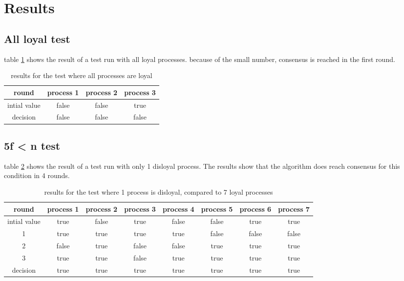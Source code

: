 \section{Results}

\subsection{All loyal test}
table \ref{table:resultsAllLoyal} shows the result of a test run with all loyal processes. because of the small number, consensus is reached in the first round.


\begin{table}[h]
	\begin{tabular}{ | c | c  | c  | c| }
		\hline
  		round & process 1 & process 2 & process 3 \\
		\hline
 		intial value &  false & false & true  \\
		\hline
  		decision  & false & false & false  \\
		\hline
	\end{tabular}
	\caption{results for the test where all processes are loyal}	
	\label{table:resultsAllLoyal}
\end{table}

\subsection{5f < n test}
table \ref{table:resultsFewDisloyal} shows the result of a test run with only 1 disloyal process.
The results show that the algorithm does reach consensus for this condition in 4 rounds.


\begin{table}[h]
	\begin{tabular}{ | c | c  | c  | c| c | c | c | c |}
		\hline
  		round & process 1 & process 2 & process 3 & process 4 & process 5 & process 6 & process 7 \\
		\hline
 		intial value &  true & false & true  & false & false & true & true \\
		\hline
		1  &  true & true & true  & true & false & false & false \\
		\hline
		2  &  false & true & false  & false & true & true & true \\
		\hline
		3  &  true & true & false  & true & true & true & true \\
		\hline
  		decision  &  true & true & true  & true & true & true & true  \\
		\hline
	\end{tabular}
	\caption{results for the test where 1 process is disloyal, compared to 7 loyal processes}	
	\label{table:resultsFewDisloyal}
\end{table}

